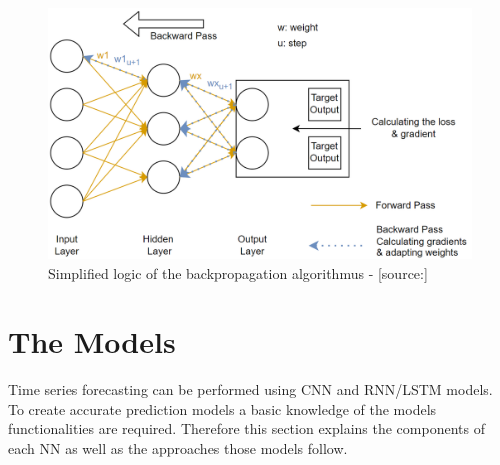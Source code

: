 \begin{figure}[H]
	\centering
		\includegraphics[width=14cm]{images/bp}
	\caption{Simplified logic of the backpropagation algorithmus - [source:\cite{bp_basic}]}
	\label{fig:bp}
\end{figure}
\section{The Models}
Time series forecasting can be performed using CNN and RNN/LSTM models. To create accurate prediction models a basic knowledge of the models functionalities are required. Therefore this section explains the components of each NN as well as the approaches those models follow. 

